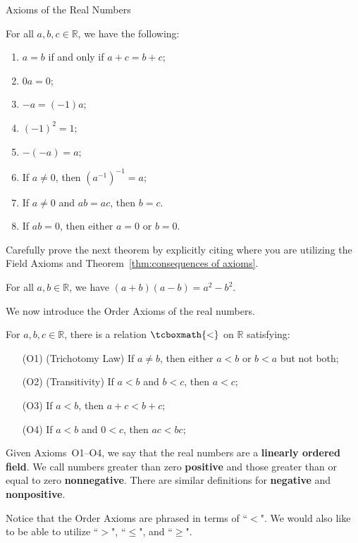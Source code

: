 \begin{section}{Axioms of the Real Numbers}
\begin{theorem}\label{thm:consequences of axioms}
For all $a,b,c\in\mathbb{R}$, we have the following:
\begin{enumerate}[label=\textrm{(\alph*)}]
\item $a=b$ if and only if $a+c=b+c$;
\item $0a=0$;
\item $-a=(-1)a$;
\item $(-1)^2 = 1$;
\item $-(-a)=a$;
\item If $a\neq 0$, then $(a^{-1})^{-1}=a$;
\item If $a\neq 0$ and $ab = ac$, then $b = c$.
\item If $ab=0$, then either $a=0$ or $b=0$.
\end{enumerate}
\end{theorem}

Carefully prove the next theorem by explicitly citing where you are utilizing the Field Axioms and Theorem~\ref{thm:consequences of axioms}.

\begin{theorem}
For all $a,b\in\mathbb{R}$, we have $(a+b)(a-b)=a^2-b^2$.
\end{theorem}

We now introduce the Order Axioms of the real numbers.

\begin{axioms}\label{axiom:order axioms}
For $a,b,c\in \mathbb{R}$, there is a relation $\tcboxmath{<}$ on $\mathbb{R}$ satisfying:
\begin{enumerate}
\item[(O1)] (Trichotomy Law) If $a\neq b$, then either $a<b$ or $b<a$ but not both;
\item[(O2)] (Transitivity) If $a<b$ and $b<c$, then $a<c$;
\item[(O3)] If $a<b$, then $a+c<b+c$;
\item[(O4)] If $a<b$ and $0<c$, then $ac<bc$;  
\end{enumerate}
\end{axioms}

Given Axioms~O1--O4, we say that the real numbers are a \textbf{linearly ordered field}. We call numbers greater than zero \textbf{positive} and those greater than or equal to zero \textbf{nonnegative}. There are similar definitions for \textbf{negative} and \textbf{nonpositive}. 

Notice that the Order Axioms are phrased in terms of ``$<$". We would also like to be able to utilize ``$>$", ``$\leq$", and ``$\geq$".


\end{section}
